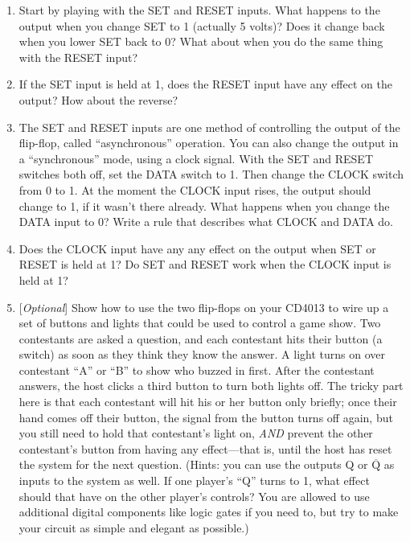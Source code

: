 \begin{enumerate}[wide]
\item Start by playing with the SET and RESET inputs.  What happens to the output when you change SET to 1 (actually 5 volts)?  Does it change back when you lower SET back to 0?  What about when you do the same thing with the RESET input?

\item If the SET input is held at 1, does the RESET input have any effect on the output?  How about the reverse?

\item The SET and RESET inputs are one method of controlling the output of the flip-flop, called ``asynchronous'' operation.  You can also change the output in a ``synchronous'' mode, using a clock signal.  With the SET and RESET switches both off, set the DATA switch to 1.  Then change the CLOCK switch from 0 to 1.  At the moment the CLOCK input rises, the output should change to 1, if it wasn't there already.  What happens when you change the DATA input to 0?  Write a rule that describes what CLOCK and DATA do.

\item Does the CLOCK input have any any effect on the output when SET or RESET is held at 1?  Do SET and RESET work when the CLOCK input is held at 1?

\item {[\textit{Optional}]} Show how to use the two flip-flops on your CD4013 to wire up a set of buttons and lights that could be used to control a game show.  Two contestants are asked a question, and each contestant hits their button (a switch) as soon as they think they know the answer.  A light turns on over contestant ``A'' or ``B'' to show who buzzed in first.  After the contestant answers, the host clicks a third button to turn both lights off.  The tricky part here is that each contestant will  hit his or her button only briefly; once their hand comes off their button, the signal from the button turns off again, but you still need to hold that contestant's light on, \textit{AND} prevent the other contestant's button from having any effect---that is, until the host has reset the system for the next question.  (Hints: you can use the outputs Q or $\mathrm{\overline{Q}}$ as inputs to the system as well.  If one player's ``Q'' turns to 1, what effect should that have on the other player's controls?  You are allowed to use additional digital components like logic gates if you need to, but try to make your circuit as simple and elegant as possible.)

\end{enumerate}

